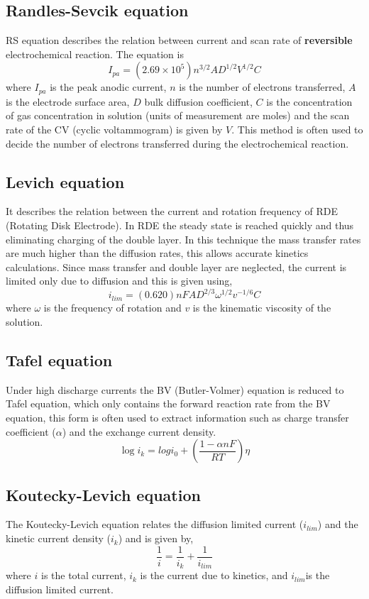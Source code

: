 \documentclass[12pt]{book}
\begin{document}
\subsection{Randles-Sevcik equation}
RS equation describes the relation between current and scan rate of \textbf{reversible} electrochemical reaction. The equation is 
\begin{equation}
I_{pa} = \left(2.69\times 10^5\right) n^{3/2}AD^{1/2}V^{1/2}C
\end{equation}where $I_{pa}$ is the peak anodic current, $n$ is the number of electrons transferred, $A$ is the electrode surface area, $D$ bulk diffusion coefficient, $C$ is the concentration of gas concentration in solution (units of measurement are moles) and the scan rate of the CV (cyclic voltammogram) is given by $V$. This method is often used to decide the number of electrons transferred during the electrochemical reaction. 
\subsection{Levich equation}
It describes the relation between the current and rotation frequency of RDE (Rotating Disk Electrode). In RDE the steady state is reached quickly and thus eliminating charging of the double layer. In this technique the mass transfer rates are much higher than the diffusion rates, this allows accurate kinetics calculations. Since mass transfer and double layer are neglected, the current is limited only due to diffusion and this is given using,
\begin{equation}
i_{lim} = (0.620)nFAD^{2/3} \omega^{1/2} v^{-1/6} C
\end{equation}
where $\omega$ is the frequency of rotation and $v$ is the kinematic viscosity of the solution.
\subsection{Tafel equation}
Under high discharge currents the BV (Butler-Volmer) equation is reduced to Tafel equation, which only contains the forward reaction rate from the BV equation, this form is often used to extract information such as charge transfer coefficient ($\alpha$) and the exchange current density.
\begin{equation}
\log i_k = log i_0 + \left(\frac{1-\alpha nF}{RT}\right)\eta
\end{equation}
\subsection{Koutecky-Levich equation}
The Koutecky-Levich equation relates the diffusion limited current ($i_{lim}$) and the kinetic current density ($i_k$) and is given by,
\begin{equation}
\frac{1}{i} = \frac{1}{i_k} + \frac{1}{i_{lim}}
\end{equation}
where $i$ is the total current, $i_k$ is the current due to kinetics, and $i_{lim}$is the diffusion limited current.
\end{document}
